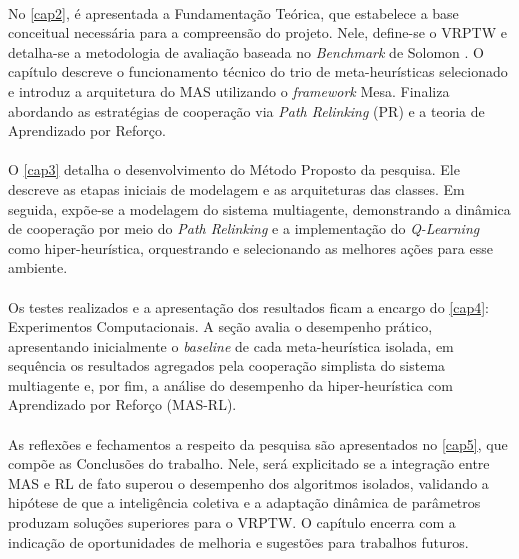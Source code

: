 \paragraph{}No \autoref{cap2}, é apresentada a Fundamentação Teórica, que estabelece a base conceitual necessária para a compreensão do projeto. Nele, define-se o VRPTW e detalha-se a metodologia de avaliação baseada no \textit{Benchmark} de Solomon \cite{Solomon87}. O capítulo descreve o funcionamento técnico do trio de meta-heurísticas selecionado e introduz a arquitetura do MAS utilizando o \textit{framework} Mesa. Finaliza abordando as estratégias de cooperação via \textit{Path Relinking} (PR) e a teoria de Aprendizado por Reforço.

\paragraph{}O \autoref{cap3} detalha o desenvolvimento do Método Proposto da pesquisa. Ele descreve as etapas iniciais de modelagem e as arquiteturas das classes. Em seguida, expõe-se a modelagem do sistema multiagente, demonstrando a dinâmica de cooperação por meio do \textit{Path Relinking} e a implementação do \textit{Q-Learning} como hiper-heurística, orquestrando e selecionando as melhores ações para esse ambiente.

\paragraph{}Os testes realizados e a apresentação dos resultados ficam a encargo do \autoref{cap4}: Experimentos Computacionais. A seção avalia o desempenho prático, apresentando inicialmente o \textit{baseline} de cada meta-heurística isolada, em sequência os resultados agregados pela cooperação simplista do sistema multiagente e, por fim, a análise do desempenho da hiper-heurística com Aprendizado por Reforço (MAS-RL).

\paragraph{}As reflexões e fechamentos a respeito da pesquisa são apresentados no \autoref{cap5}, que compõe as Conclusões do trabalho. Nele, será explicitado se a integração entre MAS e RL de fato superou o desempenho dos algoritmos isolados, validando a hipótese de que a inteligência coletiva e a adaptação dinâmica de parâmetros produzam soluções superiores para o VRPTW. O capítulo encerra com a indicação de oportunidades de melhoria e sugestões para trabalhos futuros.